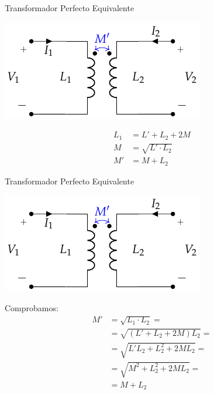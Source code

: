 \documentclass[xcolor={usenames,svgnames,dvipsnames}]{beamer}
\begin{document}
\begin{frame}[label={sec:orgf9eb022}]{Transformador Perfecto Equivalente}
\begin{center}
\includegraphics[height=0.6\textheight]{../figs/AutoTrafo_TrafoPerfecto.pdf}
\end{center}

\begin{align*}
  L_1 &= L' + L_2 + 2M\\
  M &= \sqrt{L' \cdot L_2}\\
  M' &= M + L_2
\end{align*}
\end{frame}
\begin{frame}[label={sec:org906b343}]{Transformador Perfecto Equivalente}
\begin{center}
\includegraphics[height=0.4\textheight]{../figs/AutoTrafo_TrafoPerfecto.pdf}
\end{center}
Comprobamos:
\begin{align*}
  M' &= \sqrt{L_1 \cdot L_2} = \\
     &= \sqrt{(L' + L_2 + 2M) L_2} =\\
     &= \sqrt{L'L_2 + L_2^2 + 2ML_2} =\\
     &= \sqrt{M^2 + L_2^2 + 2ML_2} = \\
     &= M + L_2
\end{align*}
\end{frame}
\end{document}
